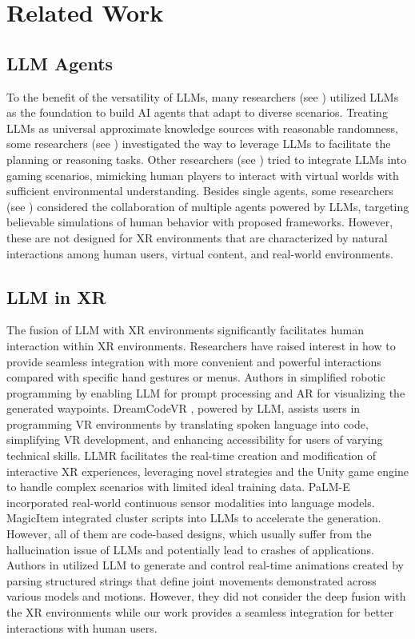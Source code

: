 \section{Related Work}
\label{sec:ref}
\subsection{LLM Agents}
To the benefit of the versatility of LLMs, many researchers (see \cite{xi2023rise, guo2024large, li2024personal}) utilized LLMs as the foundation to build AI agents that adapt to diverse scenarios. Treating LLMs as universal approximate knowledge sources with reasonable randomness, some researchers (see \cite{chen2024can,gundawar2024robust,song2023llm,kambhampati2024llms}) investigated the way to leverage LLMs to facilitate the planning or reasoning tasks. Other researchers (see \cite{singh2021pre}) tried to integrate LLMs into gaming scenarios, mimicking human players to interact with virtual worlds with sufficient environmental understanding. 
Besides single agents, some researchers (see \cite{park2023generative, gong2023mindagent, abdelnabi2023llm}) considered the collaboration of multiple agents powered by LLMs, targeting believable simulations of human behavior with proposed frameworks.
However, these are not designed for XR environments that are characterized by natural interactions among human users, virtual content, and real-world environments.


\subsection{LLM in XR}
The fusion of LLM with XR environments significantly facilitates human interaction within XR environments. Researchers have raised interest in how to provide seamless integration with more convenient and powerful interactions compared with specific hand gestures or menus. Authors in \cite{fang2024enabling} simplified robotic programming by enabling LLM for prompt processing and AR for visualizing the generated waypoints. DreamCodeVR \cite{giunchi2024dreamcodevr}, powered by LLM, assists users in programming VR environments by translating spoken language into code, simplifying VR development, and enhancing accessibility for users of varying technical skills. LLMR \cite{de2023llmr} facilitates the real-time creation and modification of interactive XR experiences, leveraging novel strategies and the Unity game engine to handle complex scenarios with limited ideal training data.  PaLM-E \cite{driess2023palm} incorporated real-world continuous sensor modalities into language models. MagicItem \cite{kurai2024magicitem} integrated cluster scripts into LLMs to accelerate the generation. However, all of them are code-based designs, which usually suffer from the hallucination issue of LLMs and potentially lead to crashes of applications.
Authors in \cite{huang2023real} utilized LLM to generate and control real-time animations created by parsing structured strings that define joint movements demonstrated across various models and motions. However, they did not consider the deep fusion with the XR environments while our work provides a seamless integration for better interactions with human users.


